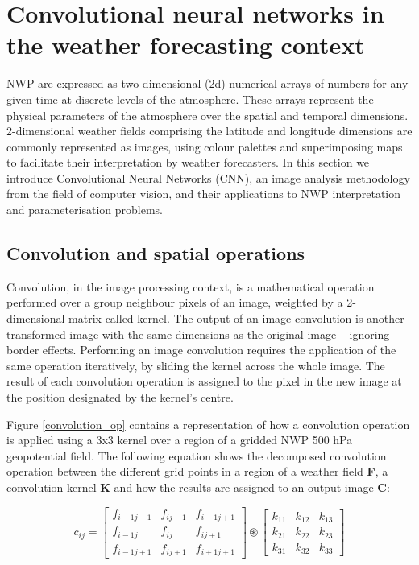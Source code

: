\documentclass[twocol]{ametsoc}
\begin{document}
\section{Convolutional neural networks in the weather forecasting context}

NWP are expressed as two-dimensional (2d) numerical arrays of numbers for any given time at discrete levels of the atmosphere.  These arrays represent the physical parameters of the atmosphere over the spatial and temporal dimensions. 2-dimensional weather fields comprising the latitude and longitude dimensions are commonly represented as images, using colour palettes and superimposing maps to facilitate their interpretation by weather forecasters. In this section we introduce Convolutional Neural Networks (CNN), an image analysis methodology from the field of computer vision, and their applications to NWP interpretation and parameterisation problems.

\subsection{Convolution and spatial operations}
Convolution, in the image processing context, is a mathematical operation performed over a group neighbour pixels of an image, weighted by a 2-dimensional matrix called kernel. The output of an image convolution is another transformed image with the same dimensions as the original image -- ignoring border effects. Performing an image convolution requires the application of the same operation iteratively, by sliding the kernel across the whole image. The result of each convolution operation is assigned to the pixel in the new image at the position designated by the kernel's centre.

Figure \ref{convolution_op} contains a representation of how a convolution operation is applied using a 3x3 kernel over a region of a gridded NWP 500 hPa geopotential field. The following equation shows the decomposed convolution operation between the different grid points in a region of a weather field \textbf{F}, a convolution kernel \textbf{K} and how the results are assigned to an output image \textbf{C}: 

\begin{equation}
c_{ij} = 
\begin{bmatrix}
    f_{i-1j-1} & f_{ij-1} & f_{i-1j+1} \\
    f_{i-1j} & f_{ij} & f_{ij+1}\\
    f_{i-1j+1} & f_{ij+1} & f_{i+1j+1}
\end{bmatrix}
\circledast
\begin{bmatrix}
    k_{11} & k_{12} & k_{13}\\
    k_{21} & k_{22} & k_{23}\\
    k_{31} & k_{32} & k_{33}
\end{bmatrix}


\end{equation}
\end{document}
